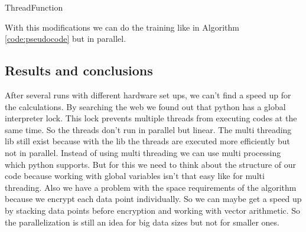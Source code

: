 \begin{text}
    \begin{algorithm}
        \caption{ThreadFunction}
        \label{threadfunction}
    	\begin{algorithmic}[1]
    	     
    	    \State
                 
                \State
                     
                \EndFor
                \State
                 
                 
                \State
                     
                         
                    \EndIf
                \EndWhile
        	\EndWhile
    	\end{algorithmic}
    \end{algorithm}
    
    \indent With this modifications we can do the training like in Algorithm \ref{code:pseudocode} but in parallel.  
    
    \subsection{Results and conclusions} 
    After several runs with different hardware set ups, we can't find a speed up for the calculations. By searching the web we found out that python has a global interpreter lock. This lock prevents multiple threads from executing codes at the same time. So the threads don’t run in parallel but linear. The multi threading lib still exist because with the lib the threads are executed more efficiently but not in parallel. \newline
    Instead of using multi threading we can use multi processing which python supports. But for this we need to think about the structure of our code because working with global variables isn't that easy like for multi threading. \newline
    Also we have a problem with the space requirements of the algorithm because we encrypt each data point individually. So we can maybe get a speed up by stacking data points before encryption and working with vector arithmetic. \newline
    So the parallelization is still an idea for big data sizes but not for smaller ones. 

\end{text}
